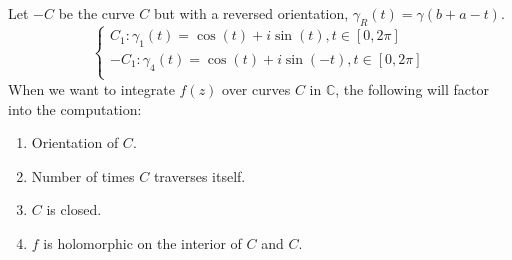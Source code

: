 \documentclass[11pt]{article}
\begin{document}
Let $-C$ be the curve $C$ but with a reversed orientation, $\gamma_{R}(t) = \gamma(b + a -t)$. 
$$
\begin{cases} 
	C_1: \gamma_1(t) = \cos(t) + i\sin(t), t \in [0, 2\pi] \\
	-C_1: \gamma_4(t) = \cos(t) + i\sin(-t),  t \in [0, 2\pi]\\
\end{cases}
$$
\newpage
When we want to integrate $f(z)$ over curves $C$ in $\mathbb{C}$, the following will factor into the computation: 
\begin{enumerate}[leftmargin = *, nolistsep]
\item Orientation of $C$. 
\item Number of times $C$ traverses itself.
\item	$C$ is closed. 
\item	$f$ is holomorphic on the interior of $C$ and $C$.
\end{enumerate}
\end{document}
